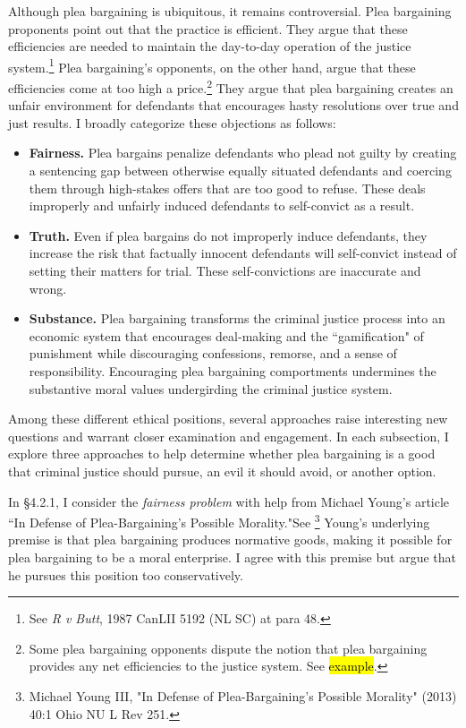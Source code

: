 Although plea bargaining is ubiquitous, it remains controversial. Plea bargaining proponents point out that the practice is efficient. They argue that these efficiencies are needed to maintain the day-to-day operation of the justice system.\footnote{See \textit{R v Butt}, 1987 CanLII 5192 (NL SC) at para 48.} Plea bargaining's opponents, on the other hand, argue that these efficiencies come at too high a price.\footnote{Some plea bargaining opponents dispute the notion that plea bargaining provides any net efficiencies to the justice system. See \hl{example}.} They argue that plea bargaining creates an unfair environment for defendants that encourages hasty resolutions over true and just results. I broadly categorize these objections as follows:

\begin{itemize}
    \item \textbf{Fairness.} Plea bargains penalize defendants who plead not guilty by creating a sentencing gap between otherwise equally situated defendants and coercing them through high-stakes offers that are too good to refuse. These deals improperly and unfairly induced defendants to self-convict as a result.
    \item \textbf{Truth.} Even if plea bargains do not improperly induce defendants, they increase the risk that factually innocent defendants will self-convict instead of setting their matters for trial. These self-convictions are inaccurate and wrong.
    \item \textbf{Substance.} Plea bargaining transforms the criminal justice process into an economic system that encourages deal-making and the ``gamification" of punishment while discouraging confessions, remorse, and a sense of responsibility. Encouraging plea bargaining comportments undermines the substantive moral values undergirding the criminal justice system.
\end{itemize}

Among these different ethical positions, several approaches raise interesting new questions and warrant closer examination and engagement. In each subsection, I explore three approaches to help determine whether plea bargaining is a good that criminal justice should pursue, an evil it should avoid, or another option. 

In \S 4.2.1, I consider the \textit{fairness problem} with help from Michael Young's article ``In Defense of Plea-Bargaining's Possible Morality."See \footnote{Michael Young III, "In Defense of Plea-Bargaining's Possible Morality" (2013) 40:1 Ohio NU L Rev 251.} Young's underlying premise is that plea bargaining produces normative goods, making it possible for plea bargaining to be a moral enterprise. I agree with this premise but argue that he pursues this position too conservatively. 

